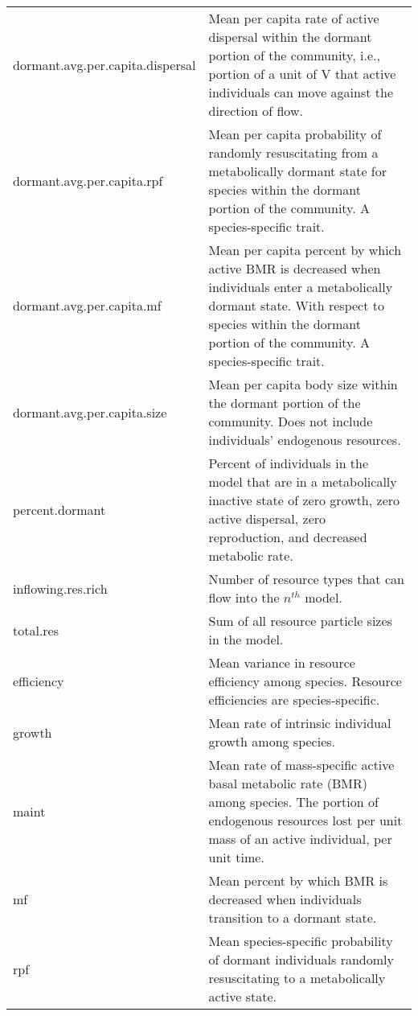 \documentclass[12pt]{article}
\begin{document}
\begin{longtable}{| p{} | p{} |}
dormant.avg.per.capita.dispersal & Mean per capita rate of active dispersal within the dormant portion of the community, i.e., portion of a unit of V that active individuals can move against the direction of flow. \\[6pt]

dormant.avg.per.capita.rpf & Mean per capita probability of randomly resuscitating from a metabolically dormant state for species within the dormant portion of the community. A species-specific trait. \\[6pt]

dormant.avg.per.capita.mf & Mean per capita percent by which active BMR is decreased when individuals enter a metabolically dormant state. With respect to species within the dormant portion of the community. A species-specific trait. \\[6pt]

dormant.avg.per.capita.size & Mean per capita body size within the dormant portion of the community. Does not include individuals' endogenous resources. \\[6pt]

percent.dormant & Percent of individuals in the model that are in a metabolically inactive state of zero growth, zero active dispersal, zero reproduction, and decreased metabolic rate. \\[6pt]

inflowing.res.rich & Number of resource types that can flow into the $n^{th}$ model. \\[6pt]

total.res & Sum of all resource particle sizes in the model. \\[6pt]


efficiency & Mean variance in resource efficiency among species. Resource efficiencies are species-specific. \\[6pt]

growth & Mean rate of intrinsic individual growth among species. \\[6pt]

maint & Mean rate of mass-specific active basal metabolic rate (BMR) among species. The portion of endogenous resources lost per unit mass of an active individual, per unit time. \\[6pt]

mf & Mean percent by which BMR is decreased when individuals transition to a dormant state. \\[6pt]

rpf & Mean species-specific probability of dormant individuals randomly resuscitating to a metabolically active state. \\[6pt]


\end{longtable}
\end{document}
